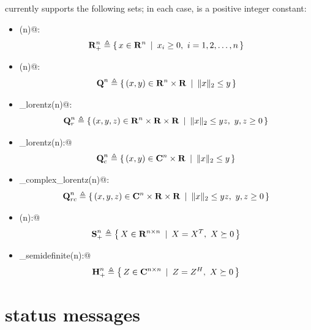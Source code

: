 \documentclass[12pt]{article}
\newcommand{\symm}{{\mbox{\bf S}}}  %
\newcommand{\herm}{{\mbox{\bf H}}}  %
\newcommand{\lorentz}{{\mbox{\bf Q}}}  %
\begin{document}
\cvx currently supports the following sets; in each case, \verb@n@ is a positive
integer constant:
\begin{itemize}
\item \verb@nonnegative(n)@:
\begin{equation*}
	\mathbf{R}^n_+ \triangleq \left\{\,x\in\mathbf{R}^{n}\,~|~\,x_i\geq 0,~i=1,2,\dots,n\,\right\}
\end{equation*}	
\item \verb@lorentz(n)@:
\begin{equation*}
\lorentz^n \eqbydef \Condset{(x,y)\in\R^n\times\R}{\|x\|_2\leq y}
\end{equation*}
\item \verb@rotated_lorentz(n)@: 
\begin{equation*}
\lorentz^n_r \eqbydef \Condset{(x,y,z)\in\R^n\times\R\times\R}{\|x\|_2\leq yz,~y,z\geq 0}
\end{equation*}
\item \verb@complex_lorentz(n):@ 
\begin{equation*}
\lorentz^n_c \eqbydef \Condset{(x,y)\in\complex^n\times\R}{\|x\|_2\leq y}
\end{equation*}
\item \verb@rotated_complex_lorentz(n)@: 
\begin{equation*}
\lorentz^n_{rc} \eqbydef \Condset{(x,y,z)\in\complex^n\times\R\times\R}{\|x\|_2\leq yz,~y,z\geq 0}
\end{equation*}
\item \verb@semidefinite(n):@ 
\begin{equation*}
\symm^n_+ \eqbydef \Condset{X\in\R^{n\times n}}{X=X^T,~X\succeq 0}
\end{equation*}
\item \verb@hermitian_semidefinite(n):@ 
\begin{equation*}
\herm^n_+ \eqbydef \Condset{Z\in\complex^{n\times n}}{Z=Z^H,~X\succeq 0}
\end{equation*}
\end{itemize}

\section{\cvx status messages}
\label{sec:status}
\end{document}
